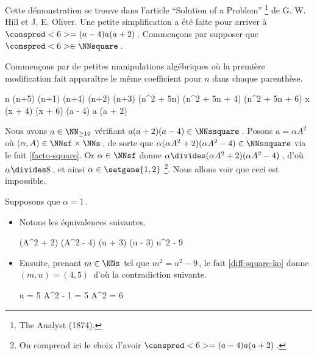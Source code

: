 Cette démonstration se trouve dans l'article \enquote{Solution of a Problem}
\footnote{
	The Analyst (1874).
}
de G. W. Hill et J. E. Oliver.
Une petite simplification a été faite pour arriver à $\consprod<6> = (a - 4) a (a + 2)$\,.
Commençons par supposer que $\consprod<6> \in \NNsquare$\,.

\smallskip

Commençons par de petites manipulations algébriques où la première modification fait apparaître le même coefficient pour $n$ dans chaque parenthèse.

\medskip
\begin{stepcalc}[style = sar]
\explnext{}
	n (n+5) \cdot (n+1) (n+4) \cdot (n+2) (n+3)
\explnext{}
	(n^2 + 5n) (n^2 + 5n + 4) (n^2 + 5n + 6)
	x (x + 4) (x + 6)
	(a - 4) a (a + 2)
\end{stepcalc}

\medskip
Nous avons $a \in \NN_{\geq 10}$ vérifiant $a (a + 2) (a - 4) \in \NNssquare$\,. 
Posons $a = \alpha A^2$ où $(\alpha, A) \in \NNsf \times \NNs$\,,
de sorte que $\alpha (\alpha A^2 + 2) (\alpha A^2 - 4) \in \NNssquare$ via le fait \ref{facto-square}.
Or $\alpha\in \NNsf$ donne $\alpha \divides (\alpha A^2 + 2) (\alpha A^2 - 4)$\,, 
d'où $\alpha \divides 8$\,, et ainsi $\alpha \in \setgene{1, 2}$
\footnote{
	On comprend ici le choix d'avoir $\consprod<6> = (a - 4) a (a + 2)$\,.
}.
Nous allons voir que ceci est impossible.

\medskip

Supposons que $\alpha = 1$\,.
%
\begin{itemize}
	\item Notons les équivalences suivantes.
   	
	\medskip
    \noindent\kern-10pt%
    \begin{stepcalc}[style=ar*, ope=\iff]
    	(A^2 + 2) (A^2 - 4) \in \NNssquare
    	(u + 3) (u - 3) \in \NNssquare
	\explnext{}
    	u^2 - 9 \in \NNssquare
    \end{stepcalc}

	\item Ensuite, prenant $m \in \NNs$ tel que $m^2 = u^2 - 9$\,, le fait \ref{diff-square-ko} donne $(m, u) = (4, 5)$\, d'où la contradiction suivante.
    
	\medskip
    \noindent\kern-8pt%
    \begin{stepcalc}[style=sar, ope=\iff]
    	u = 5
	\explnext{}
    	A^2 - 1 = 5
    	A^2 = 6
    \end{stepcalc}
\end{itemize}


